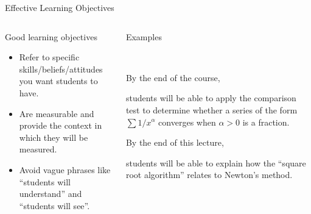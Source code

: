 \documentclass[10pt, aspectratio=169, t]{beamer}
\begin{document}
\begin{frame}{Effective Learning Objectives}
\begin{columns}
\begin{column}{0.5\textwidth}
	\begin{block}{Good learning objectives}
		\begin{itemize}
			\item Refer to \textcolor{mLightGreen}{specific skills/beliefs/attitudes} you want students to have.
			\item Are \textcolor{mLightGreen}{measurable} and provide the context in which they will be measured.\\[1.5cm]
			\item Avoid vague phrases like ``students will understand'' and ``students will see''.
		\end{itemize}
	\end{block}
\end{column}
\begin{column}{0.5\textwidth}  %
	\begin{block}{Examples}

		~\begin{minipage}{.95\textwidth}
			\begin{block}{By the end of the course, }

			students will be able to \alert{apply} the comparison test to determine
			whether a series of the form $\sum 1/x^\alpha$ converges when $\alpha>0$ is a fraction.
			\end{block}

			\begin{block}{By the end of this lecture,}

			students will be able to \alert{explain} how the ``square root algorithm''
			relates to Newton's method.
			\end{block}
		\end{minipage}


	\end{block}
\end{column}
\end{columns}
\end{frame}
\end{document}
